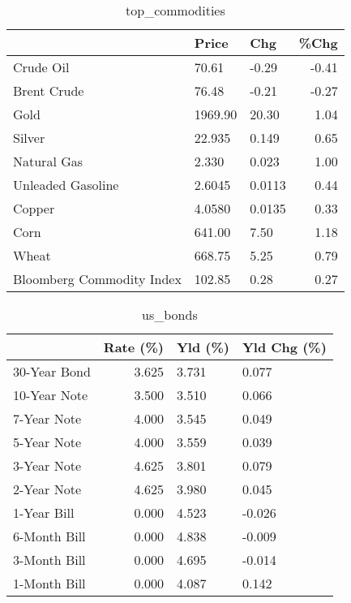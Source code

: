 \documentclass{article}%
\begin{document}
\begin{table}[htbp]%
\caption{top\_commodities}%
\centering%
\begin{adjustbox}{width=1\textwidth}%
\begin{tabular}{lllr}
\toprule
                          &   Price &    Chg &  \%Chg \\
\midrule
               Crude Oil  &   70.61 &  -0.29 & -0.41 \\
             Brent Crude  &   76.48 &  -0.21 & -0.27 \\
                    Gold  & 1969.90 &  20.30 &  1.04 \\
                  Silver  &  22.935 &  0.149 &  0.65 \\
             Natural Gas  &   2.330 &  0.023 &  1.00 \\
       Unleaded Gasoline  &  2.6045 & 0.0113 &  0.44 \\
                  Copper  &  4.0580 & 0.0135 &  0.33 \\
                    Corn  &  641.00 &   7.50 &  1.18 \\
                   Wheat  &  668.75 &   5.25 &  0.79 \\
Bloomberg Commodity Index &  102.85 &   0.28 &  0.27 \\
\bottomrule
\end{tabular}
%
\end{adjustbox}%
\end{table}

%


\begin{table}[htbp]%
\caption{us\_bonds}%
\centering%
\begin{adjustbox}{width=1\textwidth}%
\begin{tabular}{lrll}
\toprule
             &  Rate (\%) & Yld (\%) & Yld Chg (\%) \\
\midrule
30-Year Bond &     3.625 &   3.731 &       0.077 \\
10-Year Note &     3.500 &   3.510 &       0.066 \\
 7-Year Note &     4.000 &   3.545 &       0.049 \\
 5-Year Note &     4.000 &   3.559 &       0.039 \\
 3-Year Note &     4.625 &   3.801 &       0.079 \\
 2-Year Note &     4.625 &   3.980 &       0.045 \\
 1-Year Bill &     0.000 &   4.523 &      -0.026 \\
6-Month Bill &     0.000 &   4.838 &      -0.009 \\
3-Month Bill &     0.000 &   4.695 &      -0.014 \\
1-Month Bill &     0.000 &   4.087 &       0.142 \\
\bottomrule
\end{tabular}
%
\end{adjustbox}%
\end{table}
\end{document}
